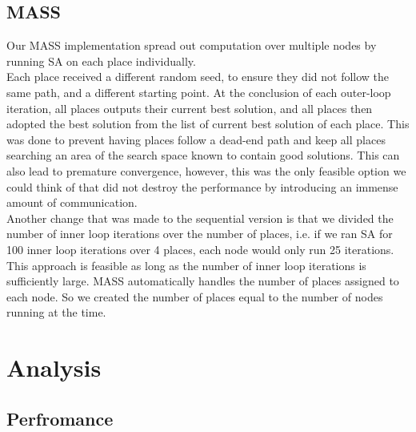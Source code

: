 \documentclass{article}
\begin{document}
		\subsection{MASS} \label{D_MASS}
			Our MASS implementation spread out computation over multiple nodes by running SA on each place individually. \\
			
			Each place received a different random seed, to ensure they did not follow the same path, and a different starting point. At the conclusion of each outer-loop iteration, all places outputs their current best solution, and all places then adopted the best solution from the list of current best solution of each place. This was done to prevent having places follow a dead-end path and keep all places searching an area of the search space known to contain good solutions. This can also lead to premature convergence, however, this was the only feasible option we could think of that did not destroy the performance by introducing an immense amount of communication. \\
			
			Another change that was made to the sequential version is that we divided the number of inner loop iterations over the number of places, i.e. if we ran SA for 100 inner loop iterations over 4 places, each node would only run 25 iterations. This approach is feasible as long as the number of inner loop iterations is sufficiently large. MASS automatically handles the number of places assigned to each node. So we created the number of places equal to the number of nodes running at the time.

\pagebreak
	
	\section{Analysis} \label{ANALYSIS}

        \subsection{Perfromance} \label{PERF}
            
\end{document}
